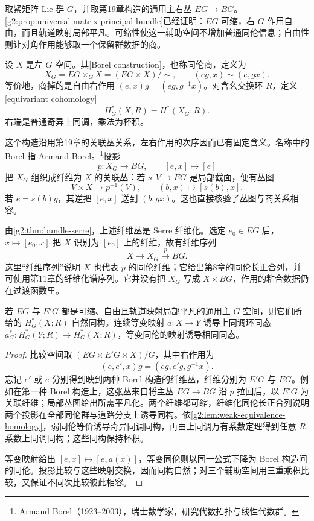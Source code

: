 取紧矩阵 Lie 群 \(G\)，并取第19章构造的通用主右丛 \(EG\to BG\)。\cref{g2:prop:universal-matrix-principal-bundle}已经证明：\(EG\) 可缩，右 \(G\) 作用自由，而且轨道映射局部平凡。可缩性使这一辅助空间不增加普通同伦信息；自由性则让对角作用能够取一个保留群数据的商。

\begin{definition}\label{g2:def:borel-construction}
	设 \(X\) 是左 \(G\) 空间。其[Borel construction]，也称同伦商，定义为
	\[
		X_G=EG\times_GX=(EG\times X)/\!\sim,
		\qquad(eg,x)\sim(e,gx).
	\]
	等价地，商掉的是自由右作用 \((e,x)g=(eg,g^{-1}x)\)。对含幺交换环 \(R\)，定义[equivariant cohomology]
	\[
		H_G^*(X;R)=H^*(X_G;R).
	\]
	右端是普通奇异上同调，乘法为杯积。
\end{definition}

这个构造沿用第19章的关联丛关系，左右作用的次序因而已有固定含义。名称中的 Borel 指 Armand Borel。\footnote{Armand Borel（1923--2003），瑞士数学家，研究代数拓扑与线性代数群。}投影
\[
	p:X_G\longrightarrow BG,\qquad[e,x]\longmapsto[e]
\]
把 \(X_G\) 组织成纤维为 \(X\) 的关联丛：若 \(s:V\to EG\) 是局部截面，便有丛图
\[
	V\times X\longrightarrow p^{-1}(V),\qquad(b,x)\longmapsto[s(b),x].
\]
若 \(e=s(b)g\)，其逆把 \([e,x]\) 送到 \((b,gx)\)。这也直接核验了丛图与商关系相容。

\ProseParagraphBreak

由\cref{g2:thm:bundle-serre}，上述纤维丛是 Serre 纤维化。选定 \(e_0\in EG\) 后，\(x\mapsto[e_0,x]\) 把 \(X\) 识别为 \([e_0]\) 上的纤维，故有纤维序列
\begin{equation}\label{g2:eq:borel-fiber-sequence}
	X\longrightarrow X_G\xrightarrow{p}BG.
\end{equation}
这里“纤维序列”说明 \(X\) 也代表 \(p\) 的同伦纤维；它给出第8章的同伦长正合列，并可使用第11章的纤维化谱序列。它并没有把 \(X_G\) 写成 \(X\times BG\)，作用的粘合数据仍在过渡函数里。

\begin{proposition}\label{g2:prop:borel-model-independence}
	若 \(EG\) 与 \(E'G\) 都是可缩、自由且轨道映射局部平凡的通用主 \(G\) 空间，则它们所给的 \(H_G^*(X;R)\) 自然同构。连续等变映射 \(a:X\to Y\) 诱导上同调环同态 \(a_G^*:H_G^*(Y;R)\to H_G^*(X;R)\)，等变同伦的映射诱导相同同态。
\end{proposition}
\begin{proof}
	比较空间取 \((EG\times E'G\times X)/G\)，其中右作用为
	\[
		(e,e',x)g=(eg,e'g,g^{-1}x).
	\]
	忘记 \(e'\) 或 \(e\) 分别得到映到两种 Borel 构造的纤维丛，纤维分别为 \(E'G\) 与 \(EG\)。例如在第一种 Borel 构造上，这张丛来自将主丛 \(EG\to BG\) 沿 \(p\) 拉回后，以 \(E'G\) 为关联纤维；局部丛图给出所需平凡化。两个纤维都可缩，纤维化同伦长正合列说明两个投影在全部同伦群与道路分支上诱导同构。依\cref{g2:lem:weak-equivalence-homology}，弱同伦等价诱导奇异同调同构，再由上同调万有系数定理得到任意 \(R\) 系数上同调同构；这些同构保持杯积。

	等变映射给出 \([e,x]\mapsto[e,a(x)]\)，等变同伦则以同一公式下降为 Borel 构造间的同伦。投影比较与这些映射交换，因而同构自然；对三个辅助空间用三重乘积比较，又保证不同次比较彼此相容。
\end{proof}

